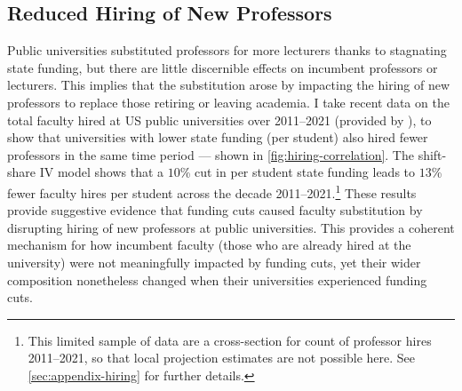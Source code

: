 \subsection{Reduced Hiring of New Professors}
Public universities substituted professors for more lecturers thanks to stagnating state funding, but there are little discernible effects on incumbent professors or lecturers.
This implies that the substitution arose by impacting the hiring of new professors to replace those retiring or leaving academia.
I take recent data on the total faculty hired at US public universities over 2011--2021 (provided by \citealt{wapman2022quantifying,wapman2022zenodo}), to show that universities with lower state funding (per student) also hired fewer professors in the same time period --- shown in \autoref{fig:hiring-correlation}.
The shift-share IV model shows that a $10$\% cut in per student state funding leads to $13$\% fewer faculty hires per student across the decade 2011--2021.\footnote{
    This limited sample of data are a cross-section for count of professor hires 2011--2021, so that local projection estimates are not possible here.
    See \autoref{sec:appendix-hiring} for further details.
}
These results provide suggestive evidence that funding cuts caused faculty substitution by disrupting hiring of new professors at public universities.
This provides a coherent mechanism for how incumbent faculty (those who are already hired at the university) were not meaningfully impacted by funding cuts, yet their wider composition nonetheless changed when their universities experienced funding cuts. 

